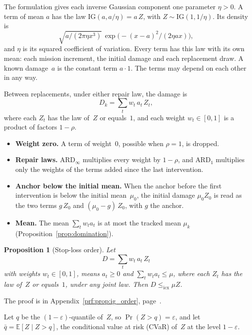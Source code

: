 \documentclass[11pt,a4paper]{article}
\theoremstyle{plain}
\newtheorem{proposition}[theorem]{Proposition}
\theoremstyle{definition}
\theoremstyle{remark}
\begin{document}
The formulation gives each inverse Gaussian component one parameter $\eta > 0$.
A term of mean $a$ has the law $\mathrm{IG}(a, a/\eta) = a\,Z$, with $Z \sim \mathrm{IG}(1, 1/\eta)$.
Its density is
\begin{equation}
  \sqrt{a/(2\pi\eta x^3)}\,\exp\bigl(-(x - a)^2/(2\eta a x)\bigr),
\end{equation}
and $\eta$ is its squared coefficient of variation.
Every term has this law with its own mean: each mission increment, the initial damage and each replacement draw.
A known damage~$a$ is the constant term $a \cdot 1$.
The terms may depend on each other in any way.

Between replacements, under either repair law, the damage is
\begin{equation}
  D_k = \sum_t w_t\, a_t\, Z_t,
\end{equation}
where each $Z_t$ has the law of~$Z$ or equals~$1$, and each weight $w_t \in [0,1]$ is a product of factors $1-\rho$.
\begin{itemize}
  \item \textbf{Weight zero.} A term of weight~$0$, possible when $\rho = 1$, is dropped.
  \item \textbf{Repair laws.} $\text{ARD}_\infty$ multiplies every weight by $1-\rho$, and $\text{ARD}_1$ multiplies only the weights of the terms added since the last intervention.
  \item \textbf{Anchor below the initial mean.} When the anchor before the first intervention is below the initial mean~$\mu_0$, the initial damage $\mu_0 Z_0$ is read as the two terms $g\,Z_0$ and $(\mu_0 - g)\,Z_0$, with $g$ the anchor.
  \item \textbf{Mean.} The mean $\sum_t w_t a_t$ is at most the tracked mean $\mu_k$ (Proposition~\ref{prop:domination}).
\end{itemize}

\begin{proposition}[Stop-loss order]\label{prop:ig_order}
Let
\begin{equation}
  D = \sum_t w_t\, a_t\, Z_t
\end{equation}
with weights $w_t \in [0,1]$, means $a_t \ge 0$ and $\sum_t w_t a_t \le \mu$, where each $Z_t$ has the law of~$Z$ or equals~$1$, under any joint law.
Then $D \le_{\mathrm{icx}} \mu Z$.
\end{proposition}
The proof is in Appendix~\ref{prf:prop:ig_order}, page~\pageref{prf:prop:ig_order}.

Let $q$ be the $(1-\varepsilon)$-quantile of~$Z$, so $\Pr(Z > q) = \varepsilon$, and let $\bar q = \mathbb{E}[Z \mid Z > q]$, the conditional value at risk (CVaR) of~$Z$ at the level $1-\varepsilon$.
\end{document}
